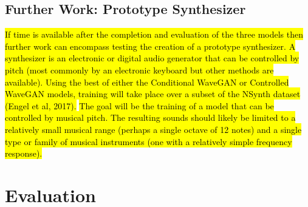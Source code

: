 \documentclass[titlepage]{article}
\begin{document}
\subsection{Further Work: Prototype Synthesizer}

\hl{
If time is available after the completion and evaluation of the three models then further work can encompass testing the creation of a prototype synthesizer.
A synthesizer is an electronic or digital audio generator that can be controlled by pitch (most commonly by an electronic keyboard but other methods are available).
Using the best of either the Conditional WaveGAN or Controlled WaveGAN models, training will take place over a subset of the NSynth dataset (Engel et al, 2017).
}
\newline
\newline
\hl{
The goal will be the training of a model that can be controlled by musical pitch.
The resulting sounds should likely be limited to a relatively small musical range (perhaps a single octave of 12 notes) and a single type or family of musical instruments (one with a relatively simple frequency response).
}

\section{Evaluation}
\end{document}
